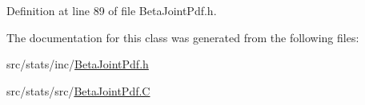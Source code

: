 Definition at line 89 of file Beta\-Joint\-Pdf.\-h.



The documentation for this class was generated from the following files\-:\begin{DoxyCompactItemize}
\item 
src/stats/inc/\hyperlink{_beta_joint_pdf_8h}{Beta\-Joint\-Pdf.\-h}\item 
src/stats/src/\hyperlink{_beta_joint_pdf_8_c}{Beta\-Joint\-Pdf.\-C}\end{DoxyCompactItemize}
